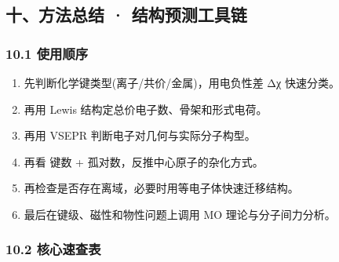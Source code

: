 \subsection{十、方法总结 · 结构预测工具链}\label{ux5341ux65b9ux6cd5ux603bux7ed3-ux7ed3ux6784ux9884ux6d4bux5de5ux5177ux94fe}

\subsubsection{10.1 使用顺序}\label{ux4f7fux7528ux987aux5e8f}

\begin{enumerate}
\def\labelenumi{\arabic{enumi}.}
\setcounter{enumi}{-1}
\tightlist
\item
  先判断化学键类型(离子/共价/金属)，用电负性差 Δχ 快速分类。
\item
  再用 Lewis 结构定总价电子数、骨架和形式电荷。
\item
  再用 VSEPR 判断电子对几何与实际分子构型。
\item
  再看  键数 + 孤对数，反推中心原子的杂化方式。
\item
  再检查是否存在离域，必要时用等电子体快速迁移结构。
\item
  最后在键级、磁性和物性问题上调用 MO 理论与分子间力分析。
\end{enumerate}

\subsubsection{10.2 核心速查表}\label{ux6838ux5fc3ux901fux67e5ux8868}

